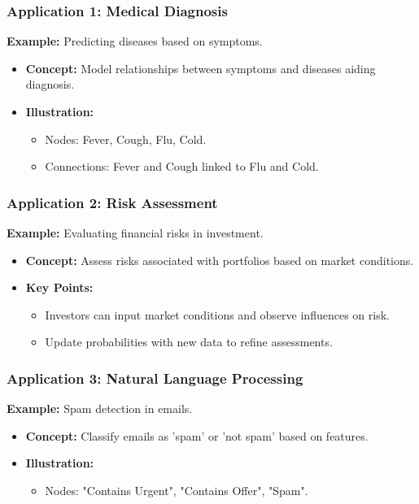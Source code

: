 \documentclass[aspectratio=169]{beamer}
\begin{document}
\begin{frame}[fragile]
    \frametitle{Application 1: Medical Diagnosis}
    \textbf{Example:} Predicting diseases based on symptoms.
    \begin{itemize}
        \item \textbf{Concept:} Model relationships between symptoms and diseases aiding diagnosis.
        \item \textbf{Illustration:}
        \begin{itemize}
            \item Nodes: Fever, Cough, Flu, Cold.
            \item Connections: Fever and Cough linked to Flu and Cold.
        \end{itemize}
    \end{itemize}
\end{frame}

\begin{frame}[fragile]
    \frametitle{Application 2: Risk Assessment}
    \textbf{Example:} Evaluating financial risks in investment.
    \begin{itemize}
        \item \textbf{Concept:} Assess risks associated with portfolios based on market conditions.
        \item \textbf{Key Points:}
        \begin{itemize}
            \item Investors can input market conditions and observe influences on risk.
            \item Update probabilities with new data to refine assessments.
        \end{itemize}
    \end{itemize}
\end{frame}

\begin{frame}[fragile]
    \frametitle{Application 3: Natural Language Processing}
    \textbf{Example:} Spam detection in emails.
    \begin{itemize}
        \item \textbf{Concept:} Classify emails as 'spam' or 'not spam' based on features.
        \item \textbf{Illustration:}
        \begin{itemize}
            \item Nodes: "Contains Urgent", "Contains Offer", "Spam".
        \end{itemize}
    \end{itemize}
\end{frame}
\end{document}
